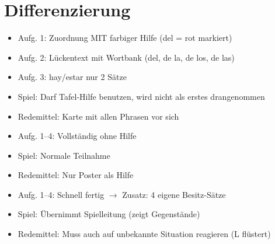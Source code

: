 \documentclass[11pt,a4paper]{article}
\begin{document}
\section*{Differenzierung}

\begin{tcolorbox}[colback=white, colframe=basis, title=\textcolor{white}{\textbf{[B] Basis}}]
\begin{itemize}[nosep]
    \item Aufg. 1: Zuordnung MIT farbiger Hilfe (del = rot markiert)
    \item Aufg. 2: Lückentext mit Wortbank (del, de la, de los, de las)
    \item Aufg. 3: hay/estar nur 2 Sätze
    \item Spiel: Darf Tafel-Hilfe benutzen, wird nicht als erstes drangenommen
    \item Redemittel: Karte mit allen Phrasen vor sich
\end{itemize}
\end{tcolorbox}

\begin{tcolorbox}[colback=white, colframe=standard, title=\textcolor{white}{\textbf{[S] Standard}}]
\begin{itemize}[nosep]
    \item Aufg. 1--4: Vollständig ohne Hilfe
    \item Spiel: Normale Teilnahme
    \item Redemittel: Nur Poster als Hilfe
\end{itemize}
\end{tcolorbox}

\begin{tcolorbox}[colback=white, colframe=erweiterung, title=\textcolor{white}{\textbf{[E] Erweiterung}}]
\begin{itemize}[nosep]
    \item Aufg. 1--4: Schnell fertig $\rightarrow$ Zusatz: 4 eigene Besitz-Sätze
    \item Spiel: Übernimmt Spielleitung (zeigt Gegenstände)
    \item Redemittel: Muss auch auf unbekannte Situation reagieren (L flüstert)
\end{itemize}
\end{tcolorbox}

\vspace{0.5cm}

\end{document}
